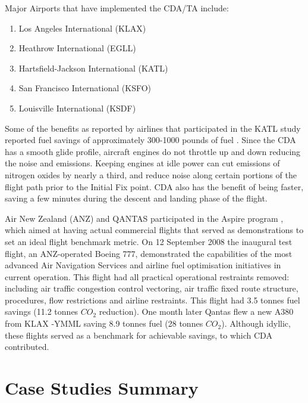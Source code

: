 \documentclass{aer1315-pretty}
\begin{document}
Major Airports that have implemented the CDA/TA include:
\vspace{-2.4mm}
\begin{enumerate}
\itemsep-0.5em
\item Los Angeles International (KLAX)
\item Heathrow International (EGLL)
\item Hartsfield-Jackson International (KATL)
\item San Francisco International (KSFO)
\item Louisville International (KSDF)
\end{enumerate}
\vspace{-2.4mm}
Some of the benefits as reported by airlines that participated in the KATL study reported fuel savings of approximately 300-1000 pounds of fuel \cite{JP:a}. Since the CDA has a smooth glide profile, aircraft engines do not throttle up and down reducing the noise and emissions. Keeping engines at idle power can cut emissions of nitrogen oxides by nearly a third, and reduce noise along certain portions of the flight path prior to the Initial Fix point. CDA also has the benefit of being faster, saving a few minutes during the descent and landing phase of the flight.\par

Air New Zealand (ANZ) and QANTAS \cite{Copp:2007} participated in the Aspire program \cite{ANZ:a}, which aimed at having actual commercial flights that served as demonstrations  to set an ideal flight benchmark metric. On 12 September 2008 the inaugural test flight, an ANZ-operated Boeing 777, demonstrated the capabilities of the most advanced Air Navigation Services and airline fuel optimisation initiatives in current operation. This flight had all practical operational restraints removed: including air traffic congestion control vectoring, air traffic fixed route structure, procedures, flow restrictions and airline restraints. This flight had 3.5 tonnes fuel savings (11.2 tonnes $CO_2$ reduction). One month later Qantas flew a new A380 from KLAX -YMML saving 8.9 tonnes fuel (28 tonnes $CO_2$). Although idyllic, these flights served as a benchmark for achievable savings, to which CDA contributed. \par
\section{Case Studies Summary}  \label{sec:case studies}
\end{document}
